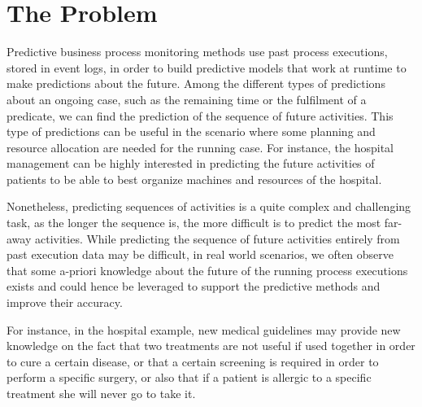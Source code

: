
\section{The Problem} %
\label{sec:the_problem}
Predictive business process monitoring methods use past process executions, stored in event logs, in order to build predictive models that work at runtime to make predictions about the future.
Among the different types of predictions about an ongoing case, such as the remaining time or the fulfilment of a predicate, we can find the prediction of the sequence of future activities. This type of predictions can be useful in the scenario where some planning and resource allocation are needed for the running case.
For instance, the hospital management can be highly interested in predicting the future activities of patients to be able to best organize machines and resources of the hospital.



Nonetheless, predicting sequences of activities is a quite complex and challenging task, as the longer the sequence is, the more difficult is to predict the most far-away activities.
While predicting the sequence of future activities entirely from past execution data may be difficult, in real world scenarios, we often observe that some a-priori knowledge about the future of the running process executions exists and could hence be leveraged to support the predictive methods and improve their accuracy.


For instance, in the hospital example, new medical guidelines may provide new knowledge on the fact that two treatments are not useful if used together in order to cure a certain disease, or that a certain screening is required in order to perform a specific surgery, or also that if a patient is allergic to a specific treatment she will never go to take it.

